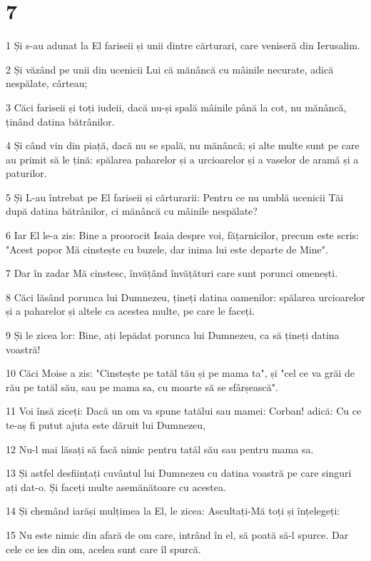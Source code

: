 \chapter{7}

\par 1 Și s-au adunat la El fariseii și unii dintre cărturari, care veniseră din Ierusalim.
\par 2 Și văzând pe unii din ucenicii Lui că mănâncă cu mâinile necurate, adică nespălate, cârteau;
\par 3 Căci fariseii și toți iudeii, dacă nu-și spală mâinile până la cot, nu mănâncă, ținând datina bătrânilor.
\par 4 Și când vin din piață, dacă nu se spală, nu mănâncă; și alte multe sunt pe care au primit să le țină: spălarea paharelor și a urcioarelor și a vaselor de aramă și a paturilor.
\par 5 Și L-au întrebat pe El fariseii și cărturarii: Pentru ce nu umblă ucenicii Tăi după datina bătrânilor, ci mănâncă cu mâinile nespălate?
\par 6 Iar El le-a zis: Bine a proorocit Isaia despre voi, fățarnicilor, precum este scris: "Acest popor Mă cinstește cu buzele, dar inima lui este departe de Mine".
\par 7 Dar în zadar Mă cinstesc, învățând învățături care sunt porunci omenești.
\par 8 Căci lăsând porunca lui Dumnezeu, țineți datina oamenilor: spălarea urcioarelor și a paharelor și altele ca acestea multe, pe care le faceți.
\par 9 Și le zicea lor: Bine, ați lepădat porunca lui Dumnezeu, ca să țineți datina voastră!
\par 10 Căci Moise a zis: "Cinstește pe tatăl tău și pe mama ta", și "cel ce va grăi de rău pe tatăl său, sau pe mama sa, cu moarte să se sfârșească".
\par 11 Voi însă ziceți: Dacă un om va spune tatălui sau mamei: Corban! adică: Cu ce te-aș fi putut ajuta este dăruit lui Dumnezeu,
\par 12 Nu-l mai lăsați să facă nimic pentru tatăl său sau pentru mama sa.
\par 13 Și astfel desființați cuvântul lui Dumnezeu cu datina voastră pe care singuri ați dat-o. Și faceți multe asemănătoare cu acestea.
\par 14 Și chemând iarăși mulțimea la El, le zicea: Ascultați-Mă toți și înțelegeți:
\par 15 Nu este nimic din afară de om care, intrând în el, să poată să-l spurce. Dar cele ce ies din om, acelea sunt care îl spurcă.
